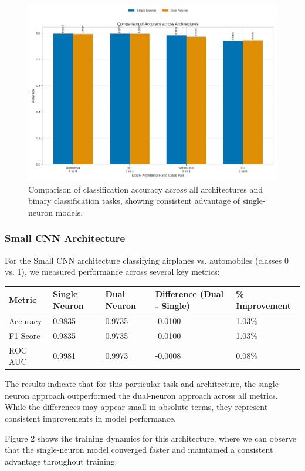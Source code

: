 \documentclass[11pt]{article}
\begin{document}
\begin{figure}[htbp]
\centering
\includegraphics[width=\textwidth]{figures/accuracy_comparison.png}
\caption{Comparison of classification accuracy across all architectures and binary classification tasks, showing consistent advantage of single-neuron models.}
\end{figure}

\subsubsection{Small CNN Architecture}
For the Small CNN architecture classifying airplanes vs. automobiles (classes 0 vs. 1), we measured performance across several key metrics:

\begin{tabular}{lllll}
\hline
Metric & Single Neuron & Dual Neuron & Difference (Dual - Single) & \% Improvement \\
\hline
Accuracy & 0.9835 & 0.9735 & -0.0100 & 1.03\% \\
F1 Score & 0.9835 & 0.9735 & -0.0100 & 1.03\% \\
ROC AUC & 0.9981 & 0.9973 & -0.0008 & 0.08\% \\
\hline
\end{tabular}

The results indicate that for this particular task and architecture, the single-neuron approach outperformed the dual-neuron approach across all metrics. While the differences may appear small in absolute terms, they represent consistent improvements in model performance.

Figure 2 shows the training dynamics for this architecture, where we can observe that the single-neuron model converged faster and maintained a consistent advantage throughout training.
\end{document}

